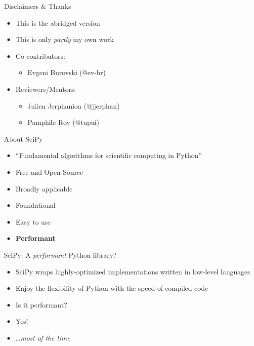 \documentclass[12pt,xcolor=dvipsnames]{beamer}
\begin{document}
    \begin{frame}{Disclaimers \& Thanks}
        \begin{itemize}
            \item<1-> This is the abridged version
            \item<2-> This is only \textit{partly} my own work
            \item<3-> Co-contributors:
            \begin{itemize}
                \item Evgeni Burovski (@ev-br)
            \end{itemize}
            \item<4-> Reviewers/Mentors:
            \begin{itemize}
                \item Julien Jerphanion (@jjerphan)
                \item Pamphile Roy (@tupui)
            \end{itemize}
        \end{itemize}
    \end{frame}

    \begin{frame}{About SciPy}
        \begin{itemize}
            \item ``Fundamental algorithms for scientific computing in Python''
            \item Free and Open Source
            \item Broadly applicable
            \item Foundational
            \item Easy to use
            \item \textbf{Performant}
        \end{itemize}
    \end{frame}

    \begin{frame}{SciPy: A \textit{performant} Python library?}
        \begin{itemize}
            \item<1-> SciPy wraps highly-optimized implementations written in low-level languages
            \item<1-> Enjoy the flexibility of Python with the speed of compiled code
            \item<1-> Is it performant?
            \item<2-> Yes!
            \item<3-> \ldots \textit{most of the time}
        \end{itemize}
    \end{frame}
\end{document}
